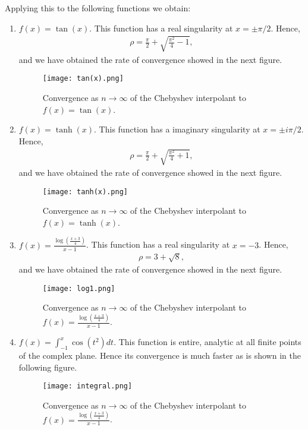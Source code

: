 Applying this to the following functions we obtain:
\begin{enumerate}[label=\alph*)]
\item $f(x) = \tan(x)$. This function has a real singularity at $x=\pm \pi/2$. Hence, 
\begin{align*}
\rho = \frac{\pi}{2}+\sqrt{\frac{\pi^2}{4}-1},
\end{align*}
and we have obtained the rate of convergence showed in the next figure.
\begin{figure}[H]
\centering
\texttt{[image: tan(x).png]}\caption{Convergence as $n\rightarrow\infty$ of the Chebyshev interpolant to $f(x)=\tan(x)$.}
\end{figure}


\item $f(x) = \tanh(x)$. This function has a imaginary singularity at $x=\pm i\pi/2$. Hence, 
\begin{align*}
\rho = \frac{\pi}{2}+\sqrt{\frac{\pi^2}{4}+1},
\end{align*}
and we have obtained the rate of convergence showed in the next figure.
\begin{figure}[H]
\centering
\texttt{[image: tanh(x).png]}\caption{Convergence as $n\rightarrow\infty$ of the Chebyshev interpolant to $f(x)=\tanh(x)$.}
\end{figure}


\item $f(x) = \frac{\log(\frac{x+3}{4})}{x-1}$. This function has a real singularity at $x=-3$. Hence, 
\begin{align*}
\rho = 3+\sqrt{8},
\end{align*}
and we have obtained the rate of convergence showed in the next figure.
\begin{figure}[H]
\centering
\texttt{[image: log1.png]}\caption{Convergence as $n\rightarrow\infty$ of the Chebyshev interpolant to $f(x)= \frac{\log(\frac{x+3}{4})}{x-1}$.}
\end{figure}

\item $f(x) = \int_{-1}^{x}\cos(t^2)dt$. This function is entire, analytic at all finite points of the complex plane. Hence its convergence is much faster as is shown in the following figure.
\begin{figure}[H]
\centering
\texttt{[image: integral.png]}\caption{Convergence as $n\rightarrow\infty$ of the Chebyshev interpolant to $f(x)= \frac{\log(\frac{x+3}{4})}{x-1}$.}
\end{figure}




\end{enumerate}
